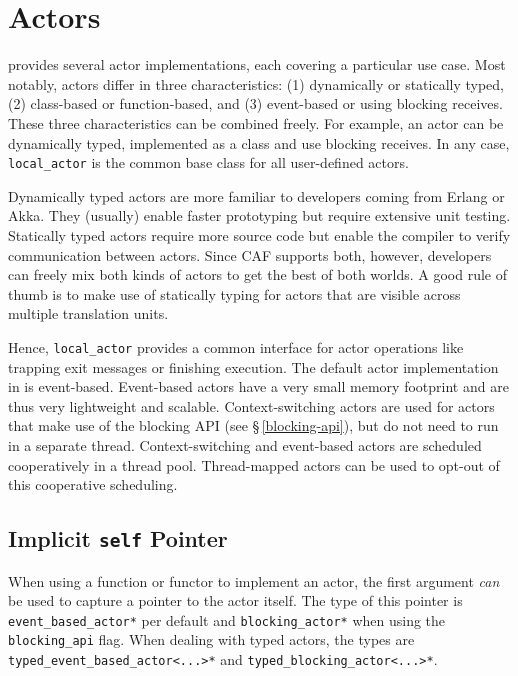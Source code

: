 \section{Actors}
\label{actors}

\lib provides several actor implementations, each covering a particular use case.
Most notably, actors differ in three characteristics: (1) dynamically or statically typed, (2) class-based or function-based, and (3) event-based or using blocking receives.
These three characteristics can be combined freely.
For example, an actor can be dynamically typed, implemented as a class and use blocking receives.
In any case, \lstinline^local_actor^ is the common base class for all user-defined actors.

Dynamically typed actors are more familiar to developers coming from Erlang or Akka.
They (usually) enable faster prototyping but require extensive unit testing.
Statically typed actors require more source code but enable the compiler to verify communication between actors.
Since CAF supports both, however, developers can freely mix both kinds of actors to get the best of both worlds.
A good rule of thumb is to make use of statically typing for actors that are visible across multiple translation units.



Hence, \lstinline^local_actor^ provides a common interface for actor operations like trapping exit messages or finishing execution.
The default actor implementation in \lib is event-based.
Event-based actors have a very small memory footprint and are thus very lightweight and scalable.
Context-switching actors are used for actors that make use of the blocking API (see \S\,\ref{blocking-api}), but do not need to run in a separate thread.
Context-switching and event-based actors are scheduled cooperatively in a thread pool.
Thread-mapped actors can be used to opt-out of this cooperative scheduling.

\subsection{Implicit \texttt{self} Pointer}

When using a function or functor to implement an actor, the first argument \emph{can} be used to capture a pointer to the actor itself.
The type of this pointer is \lstinline^event_based_actor*^ per default and \lstinline^blocking_actor*^ when using the \lstinline^blocking_api^ flag.
When dealing with typed actors, the types are \lstinline^typed_event_based_actor<...>*^ and \lstinline^typed_blocking_actor<...>*^.

